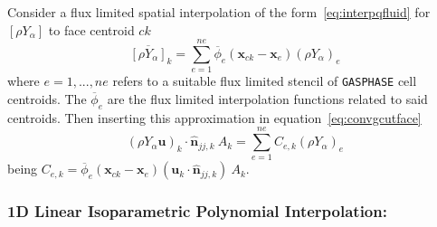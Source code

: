 \documentclass[12pt]{article}
\begin{document}
Consider a flux limited spatial interpolation of the form~\eqref{eq:interpqfluid} for $[\rho Y_\alpha]$ to face centroid $ck$
%
\begin{equation}
  \overline{[\rho Y_\alpha]}_k = \sum^{ne}_{e=1} \overline{\phi}_e(\mathbf{x}_{ck}-\mathbf{x}_e) \left( \rho Y_{\alpha} \right)_e
\end{equation}
%
where $e=1,...,ne$ refers to a suitable flux limited stencil of \texttt{GASPHASE} cell centroids. The $\overline{\phi}_e$ are the flux limited interpolation functions  related to said centroids. Then inserting this approximation in equation~\eqref{eq:convgcutface}
%
\begin{equation}
  \left( \rho Y_\alpha \mathbf{u} \right)_k \cdot \hat{\mathbf{n}}_{jj,k} \: A_k = \sum^{ne}_{e=1}  C_{e,k} \left( \rho Y_{\alpha} \right)_e
\end{equation}
being $C_{e,k}=\overline{\phi}_e(\mathbf{x}_{ck}-\mathbf{x}_e) \left( \mathbf{u}_k \cdot \hat{\mathbf{n}}_{jj,k} \right) \: A_k$.


\subsubsection*{1D Linear Isoparametric Polynomial Interpolation:}
\end{document}
